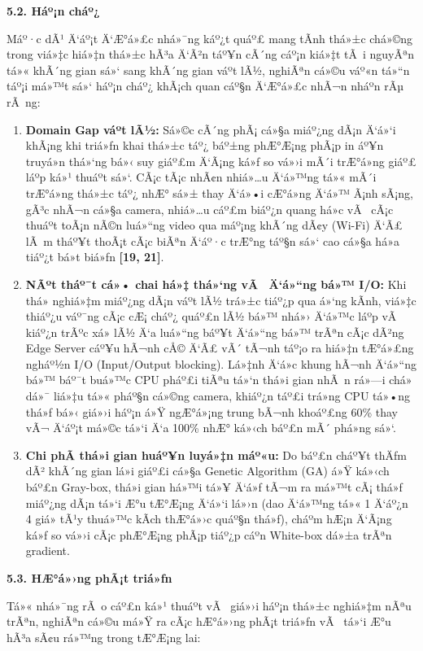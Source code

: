 \documentclass[]{article}
\begin{document}
\textbf{5.2. Háº¡n cháº¿}

Máº·c dÃ¹ Ä‘áº¡t Ä‘Æ°á»£c nhá»¯ng káº¿t quáº£ mang tÃ­nh thá»±c chá»©ng trong viá»‡c hiá»‡n thá»±c
hÃ³a Ä‘Ã²n táº¥n cÃ´ng cáº¡n kiá»‡t tÃ i nguyÃªn tá»« khÃ´ng gian sá»‘ sang khÃ´ng gian
váº­t lÃ½, nghiÃªn cá»©u váº«n tá»“n táº¡i má»™t sá»‘ háº¡n cháº¿ khÃ¡ch quan cáº§n Ä‘Æ°á»£c nhÃ¬n
nháº­n rÃµ rÃ ng:

\begin{enumerate}
\def\labelenumi{\arabic{enumi}.}
\item
  \textbf{Domain Gap váº­t lÃ½:} Sá»©c cÃ´ng phÃ¡ cá»§a miáº¿ng
  dÃ¡n Ä‘á»‘i khÃ¡ng khi triá»ƒn khai thá»±c táº¿ báº±ng phÆ°Æ¡ng phÃ¡p in áº¥n truyá»n
  thá»‘ng bá»‹ suy giáº£m Ä‘Ã¡ng ká»ƒ so vá»›i mÃ´i trÆ°á»ng giáº£ láº­p ká»¹ thuáº­t sá»‘. CÃ¡c
  tÃ¡c nhÃ¢n nhiá»…u Ä‘á»™ng tá»« mÃ´i trÆ°á»ng thá»±c táº¿ nhÆ° sá»± thay Ä‘á»•i cÆ°á»ng Ä‘á»™ Ã¡nh
  sÃ¡ng, gÃ³c nhÃ¬n cá»§a camera, nhiá»…u cáº£m biáº¿n quang há»c vÃ  cÃ¡c thuáº­t toÃ¡n
  nÃ©n luá»“ng video qua máº¡ng khÃ´ng dÃ¢y (Wi-Fi) Ä‘Ã£ lÃ m tháº¥t thoÃ¡t cÃ¡c biÃªn
  Ä‘áº·c trÆ°ng táº§n sá»‘ cao cá»§a há»a tiáº¿t bá»t biá»ƒn \textbf{{[}19, 21{]}}.
\item
  \textbf{NÃºt tháº¯t cá»• chai há»‡ thá»‘ng vÃ  Ä‘á»“ng bá»™ I/O:} Khi thá»­ nghiá»‡m
  miáº¿ng dÃ¡n váº­t lÃ½ trá»±c tiáº¿p qua á»‘ng kÃ­nh, viá»‡c thiáº¿u váº¯ng cÃ¡c cÆ¡ cháº¿
  quáº£n lÃ½ bá»™ nhá»› Ä‘á»™c láº­p vÃ  kiáº¿n trÃºc xá»­ lÃ½ Ä‘a luá»“ng báº¥t Ä‘á»“ng bá»™ trÃªn
  cÃ¡c dÃ²ng Edge Server cáº¥u hÃ¬nh cÅ© Ä‘Ã£ vÃ´ tÃ¬nh táº¡o ra hiá»‡n tÆ°á»£ng ngháº½n
  I/O (Input/Output blocking). Lá»‡nh Ä‘á»c khung hÃ¬nh Ä‘á»“ng bá»™ báº¯t buá»™c CPU
  pháº£i tiÃªu tá»‘n thá»i gian nhÃ n rá»—i chá» dá»¯ liá»‡u tá»« pháº§n cá»©ng camera,
  khiáº¿n táº£i trá»ng CPU tá»•ng thá»ƒ bá»‹ giá»›i háº¡n á»Ÿ ngÆ°á»¡ng trung bÃ¬nh khoáº£ng
  60\% thay vÃ¬ Ä‘áº¡t má»©c tá»‘i Ä‘a 100\% nhÆ° ká»‹ch báº£n mÃ´ phá»ng sá»‘.
\item
  \textbf{Chi phÃ­ thá»i gian huáº¥n luyá»‡n máº«u:} Do báº£n cháº¥t thÄƒm dÃ² khÃ´ng
  gian lá»i giáº£i cá»§a Genetic Algorithm (GA) á»Ÿ ká»‹ch báº£n Gray-box, thá»i gian
  há»™i tá»¥ Ä‘á»ƒ tÃ¬m ra má»™t cÃ¡ thá»ƒ miáº¿ng dÃ¡n tá»‘i Æ°u tÆ°Æ¡ng Ä‘á»‘i lá»›n (dao Ä‘á»™ng
  tá»« 1 Ä‘áº¿n 4 giá» tÃ¹y thuá»™c kÃ­ch thÆ°á»›c quáº§n thá»ƒ), cháº­m hÆ¡n Ä‘Ã¡ng ká»ƒ so vá»›i
  cÃ¡c phÆ°Æ¡ng phÃ¡p tiáº¿p cáº­n White-box dá»±a trÃªn gradient.
\end{enumerate}

\textbf{5.3. HÆ°á»›ng phÃ¡t triá»ƒn}

Tá»« nhá»¯ng rÃ o cáº£n ká»¹ thuáº­t vÃ  giá»›i háº¡n thá»±c nghiá»‡m nÃªu trÃªn, nghiÃªn cá»©u
má»Ÿ ra cÃ¡c hÆ°á»›ng phÃ¡t triá»ƒn vÃ  tá»‘i Æ°u hÃ³a sÃ¢u rá»™ng trong tÆ°Æ¡ng lai:
\end{document}
